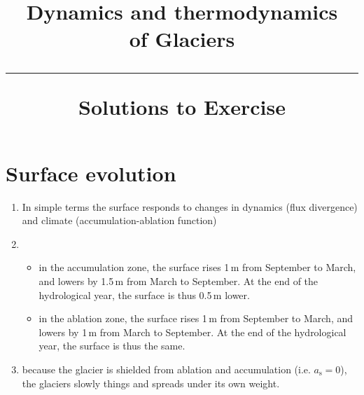 \documentclass[parskip=half]{scrartcl}
\begin{document}
\vspace{-5em}

\title{Dynamics and thermodynamics \\ of Glaciers \\[.2em]
\rule[1em]{\textwidth}{2pt}
\LARGE{\sf Solutions to Exercise}
}
\date{}

\maketitle


\vspace{-5em}

\section{Surface evolution}

\begin{enumerate}
\item In simple terms the surface responds to changes in dynamics (flux divergence) and climate (accumulation-ablation function)
\item
\begin{itemize}
\item in the accumulation zone, the surface rises 1\,m from September to March, and lowers by 1.5\,m from March to September. At the end of the hydrological year, the surface is thus 0.5\,m lower.
\item in the ablation zone, the surface rises 1\,m from September to March, and lowers by 1\,m from March to September. At the end of the hydrological year, the surface is thus the same.
\end{itemize}


\item because the glacier is shielded from ablation and accumulation (i.e. $a_{\textrm{s}} =0$), the glaciers slowly things and spreads under its own weight.
\end{enumerate}
\end{document}
